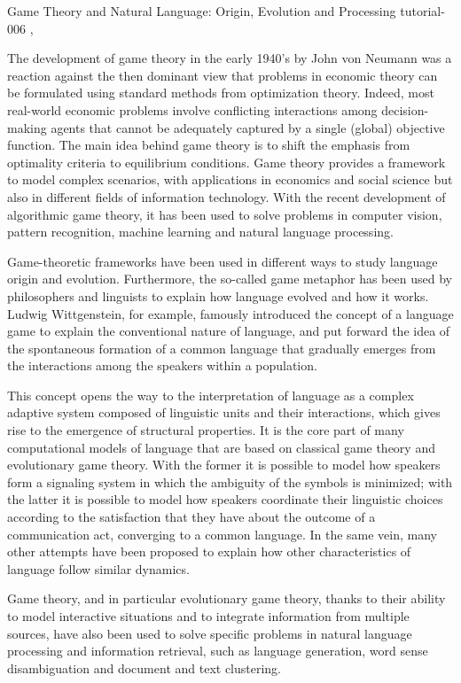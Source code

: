 
\begin{tutorial}
  {Game Theory and Natural Language: Origin, Evolution and Processing}
  {tutorial-006}
  {\daydateyear, \tutorialafternoontime}
  {\TutLocF}

The development of game theory in the early 1940's by John von Neumann was a reaction against the then dominant view that problems in economic theory can be formulated using standard methods from optimization theory. Indeed, most real-world economic problems involve conflicting interactions among decision-making agents that cannot be adequately captured by a single (global) objective function. The main idea behind game theory is to shift the emphasis from optimality criteria to equilibrium conditions. Game theory provides a framework to model complex scenarios, with applications in economics and social science but also in different fields of information technology. With the recent development of algorithmic game theory, it has been used to solve problems in computer vision, pattern recognition, machine learning and natural language processing.

Game-theoretic frameworks have been used in different ways to study language origin and evolution. Furthermore, the so-called game metaphor has been used by philosophers and linguists to explain how language evolved and how it works. Ludwig Wittgenstein, for example, famously introduced the concept of a language game to explain the conventional nature of language, and put forward the idea of the spontaneous formation of a common language that gradually emerges from the interactions among the speakers within a population.

This concept opens the way to the interpretation of language as a complex adaptive system composed of linguistic units and their interactions, which gives rise to the emergence of structural properties. It is the core part of many computational models of language that are based on classical game theory and evolutionary game theory. With the former it is possible to model how speakers form a signaling system in which the ambiguity of the symbols is minimized; with the latter it is possible to model how speakers coordinate their linguistic choices according to the satisfaction that they have about the outcome of a communication act, converging to a common language. In the same vein, many other attempts have been proposed to explain how other characteristics of language follow similar dynamics.

Game theory, and in particular evolutionary game theory, thanks to their ability to model interactive situations and to integrate information from multiple sources, have also been used to solve specific problems in natural language processing and information retrieval, such as language generation, word sense disambiguation and document and text clustering.


\end{tutorial}
